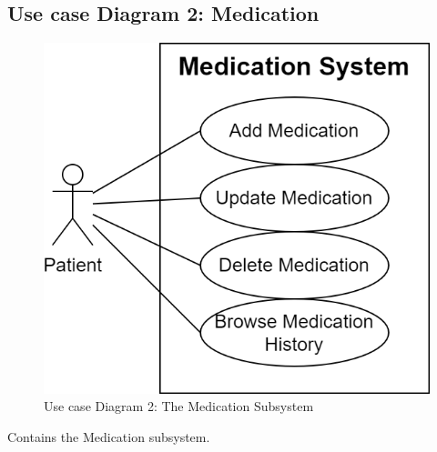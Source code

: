 \documentclass[11pt]{article}
\begin{document}
    \subsection{Use case Diagram 2: Medication}\label{subsec:use-case-diagram-2:-medication}
    \begin{figure}[H]
        \centering
        \includegraphics[height=0.3\textheight]{Diagrams/Use Case Diagrams/Use Case Diagram 2}
        \caption{Use case Diagram 2: The Medication Subsystem}
        \label{fig:Use case Diagram 2: The Medication Subsystem}
    \end{figure}

    Contains the Medication subsystem.
\end{document}
